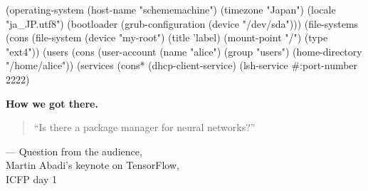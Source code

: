 \documentclass{beamer}
\begin{document}
\begin{frame}[fragile]
  \begin{semiverbatim}
    \small{
(\alert{operating-system}
  (host-name "schememachine")
  (timezone "Japan")
  (locale "ja_JP.utf8")
  (bootloader (grub-configuration (device "/dev/sda")))
  (file-systems (cons (\alert{file-system}
                        (device "my-root")
                        (title 'label)
                        (mount-point "/")
                        (type "ext4"))
  (users (cons (\alert{user-account}
                 (name "alice")
                 (group "users")
                 (home-directory "/home/alice"))
  (services (cons* (dhcp-client-service)
                   (lsh-service #:port-number 2222)
    }
  \end{semiverbatim}
\end{frame}

\begin{frame}
  \Huge{\textbf{How we got there.}}
\end{frame}

\begin{frame}
  \begin{quotation}
    \noindent
    \LARGE{``Is there a package manager for neural networks?''}
  \end{quotation}
  \vspace{1cm}
  \hfill{--- Question from the audience,}\\
  \hfill{Martin Abadi's keynote on TensorFlow,}\\
  \hfill{ICFP day 1}
\end{frame}
\end{document}
